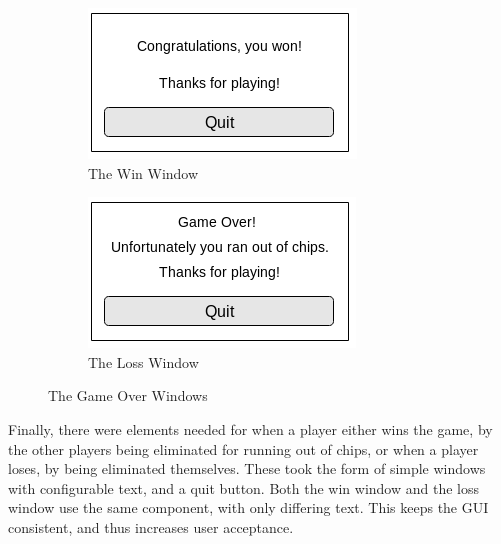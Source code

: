 \begin{figure}[H]
    \centering
    \begin{subfigure}[h]{0.4\textwidth}
        \includegraphics[width=\textwidth]{../images/winscreen.png}
        \caption{The Win Window}%
        \label{fig:winwindow}
    \end{subfigure}
    \begin{subfigure}[h]{0.4\textwidth}
        \includegraphics[width=\textwidth]{../images/lossscreen.png}
        \caption{The Loss Window}%
        \label{fig:losswindow}
    \end{subfigure}
    \caption{The Game Over Windows}\label{fig:gameoverwindows}
\end{figure}

Finally, there were elements needed for when a player either wins the game,
by the other players being eliminated for running out of chips, or when a
player loses, by being eliminated themselves. These took the form of simple
windows with configurable text, and a quit button. Both the win window
and the loss window use the same component, with only differing text. This
keeps the GUI consistent, and thus increases user acceptance.

